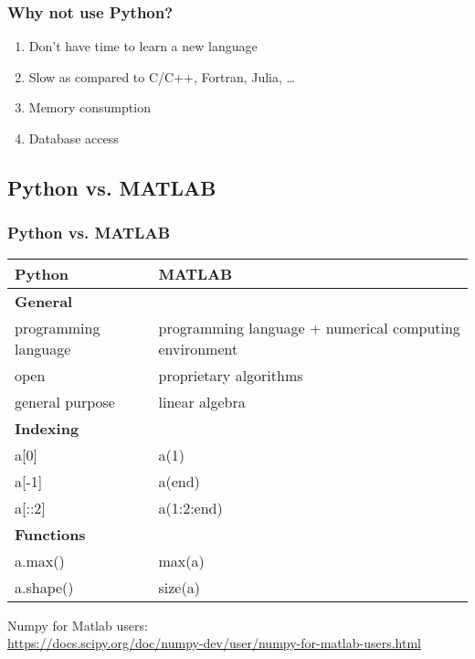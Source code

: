 \begin{frame}[c]
\frametitle{Why not use Python?}


\begin{enumerate}
\item Don't have time to learn a new language
\item Slow as compared to C/C++, Fortran, Julia, \ldots
\item Memory consumption
\item Database access
\end{enumerate}

\end{frame}


\subsection{Python vs. MATLAB}

\begin{frame}[fragile]
\frametitle{Python vs. MATLAB}
\footnotesize

\begin{table}
\scriptsize
\begin{tabular}{p{}p{}}
\toprule
Python  	  				& MATLAB\\
\midrule
\textbf{General}			& \\
programming language		& programming language + numerical computing environment\\
open						& proprietary algorithms\\
general purpose				& linear algebra\\
\midrule
\textbf{Indexing} 			& 	\\
a[0]						& a(1) \\
a[-1]						& a(end)\\
a[::2]						& a(1:2:end)\\
\midrule
\textbf{Functions}			& \\
a.max()						& max(a)\\
a.shape()					& size(a)\\
\bottomrule
\end{tabular}
\end{table}

\vfill

Numpy for Matlab users:\\
\url{https://docs.scipy.org/doc/numpy-dev/user/numpy-for-matlab-users.html}

\end{frame}

